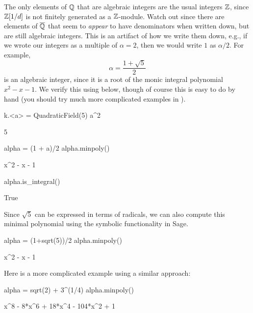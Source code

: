 The only elements of $\mathbb{Q}$ that are algebraic
integers are the usual integers $\mathbb{Z}$, since $\mathbb{Z}[1/d]$ is not finitely
generated as a $\mathbb{Z}$-module.  Watch out since there are elements of
$\overline{\mathbb{Q}}$ that seem to {\em appear} to have denominators when written down, but are still
algebraic integers.  
This is an artifact of how we write them down, e.g., if we wrote
our integers as a multiple of $\alpha=2$, then we would write $1$
as $\alpha/2$.
For example,
$$
  \alpha = \frac{1+\sqrt{5}}{2}
$$
is an algebraic integer, since it is a root of the monic integral
polynomial $x^2 - x - 1$.  We verify this using \sage below,
though of course this is easy to do by hand (you should try
much more complicated examples in \sage).
\begin{sagecode}
\begin{sagecell}
k.<a> = QuadraticField(5)
a^2
\end{sagecell}
\begin{sageout}
5
\end{sageout}
\begin{sagecell}
alpha = (1 + a)/2
alpha.minpoly()
\end{sagecell}
\begin{sageout}
x^2 - x - 1
\end{sageout}
\begin{sagecell}
alpha.is_integral()
\end{sagecell}
\begin{sageout}
True
\end{sageout}
\end{sagecode}

Since $\sqrt{5}$ can be expressed in terms of radicals, we can also
compute this minimal polynomial using the symbolic functionality in
Sage.
\begin{sagecode}
\begin{sagecell}
alpha = (1+sqrt(5))/2
alpha.minpoly()
\end{sagecell}
\begin{sageout}
x^2 - x - 1
\end{sageout}
Here is a more complicated example using a similar approach:
\begin{sagecell}
alpha = sqrt(2) + 3^(1/4)
alpha.minpoly()
\end{sagecell}
\begin{sageout}
x^8 - 8*x^6 + 18*x^4 - 104*x^2 + 1
\end{sageout}
\end{sagecode}

